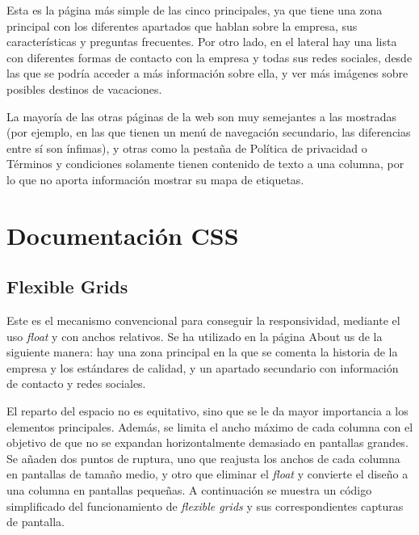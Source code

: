 \documentclass[11pt, a4paper]{book}
\begin{document}
	Esta es la página más simple de las cinco principales, ya que tiene una zona principal con los diferentes apartados que hablan sobre la empresa, sus características y preguntas frecuentes. Por otro lado, en el lateral hay una lista con diferentes formas de contacto con la empresa y todas sus redes sociales, desde las que se podría acceder a más información sobre ella, y ver más imágenes sobre posibles destinos de vacaciones.
	
	
	La mayoría de las otras páginas de la web son muy semejantes a las mostradas (por ejemplo, en las que tienen un menú de navegación secundario, las diferencias entre sí son ínfimas), y otras como la pestaña de Política de privacidad o Términos y condiciones solamente tienen contenido de texto a una columna, por lo que no aporta información mostrar su mapa de etiquetas.
	
	
	
	
	
	
	
	\chapter{Documentación CSS}
	
	\section{Flexible Grids}
	Este es el mecanismo convencional para conseguir la responsividad, mediante el uso \textit{float} y con anchos relativos. Se ha utilizado en la página About us de la siguiente manera: hay una zona principal en la que se comenta la historia de la empresa y los estándares de calidad, y un apartado secundario con información de contacto y redes sociales.
	
	El reparto del espacio no es equitativo, sino que se le da mayor importancia a los elementos principales. Además, se limita el ancho máximo de cada columna con el objetivo de que no se expandan horizontalmente demasiado en pantallas grandes. Se añaden dos puntos de ruptura, uno que reajusta los anchos de cada columna en pantallas de tamaño medio, y otro que eliminar el \textit{float} y convierte el diseño a una columna en pantallas pequeñas. A continuación se muestra un código simplificado del funcionamiento de \textit{flexible grids} y sus correspondientes capturas de pantalla.
	
\end{document}
